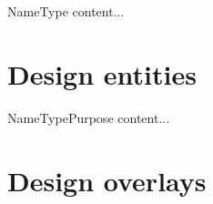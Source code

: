		\begin{design-element}{Name}{Type}
			content...
		\end{design-element}
	\section{Design entities} \label{s:view-template:design-entities}
		\begin{comment}
			Design entities capture key elements of a software design.
			
			Each design entity shall have a name (4.6.2.1), a type (4.6.2.2), and purpose (4.6.2.3).
			
			Examples of design entities include, but are not limited to, the following: systems, subsystems, libraries,
			frameworks, abstract collaboration patterns, generic templates, components, classes, data stores, modules,
			program units, programs, and processes.
			
			NOTE—The number and types of entities needed to express a design view are dependent on a number of factors, such
			as the complexity of the system, the design technique used, and the tool support environment.
		\end{comment}
		
		\begin{design-entity}{Name}{Type}{Purpose}
			content...
		\end{design-entity}
		
	\section{Design overlays} \label{s:view-template:design-overlays}
		\begin{comment}
			A design overlay is used for presenting additional information with respect to an already-defined design
			view.
			
			Each design overlay shall be uniquely named and marked as an overlay.
			
			Each design overlay shall be clearly associated with a single viewpoint.
			
			NOTE—Reasons to utilize a design overlay as a part of an SDD include: to provide an extension mechanism for design
			information to be presented conveniently on top of some view without a requirement for existing external
			standardization of languages and notations for such representation; to extend expressive power of representation with
			additional details while reusing information from existing views (i.e., without a need to define additional views or
			persistently store derivable design information); and to relate design information with facts from the system
			environment for the convenience of the designer (or other stakeholders).
		\end{comment}	
		

